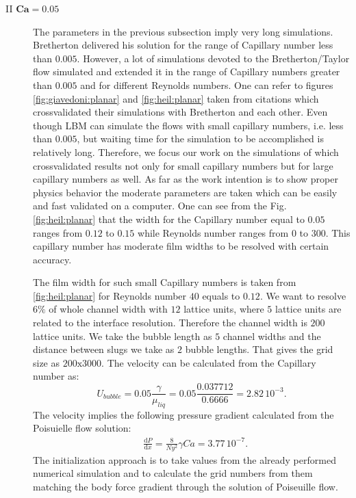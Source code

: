 \documentclass{article}
\begin{document}
\begin{description}
 \item[II $\bm{Ca=0.05}$] 
   The parameters in the previous subsection imply very long
simulations. Bretherton delivered his solution for the range of Capillary number
less than
  $0.005$. However, a lot of simulations devoted to the Bretherton/Taylor
flow
  simulated and extended it in the range of Capillary numbers greater than
$0.005$
  and for different Reynolds numbers. One can refer to figures
  \ref{fig:giavedoni:planar} and \ref{fig:heil:planar} taken from citations
  \cite{giavedoni-numerical,heil-bretherton} which crossvalidated their
  simulations with Bretherton and each other. Even though LBM can simulate the
flows with small capillary numbers, i.e. less than $0.005$, but waiting time
for the simulation to be accomplished is relatively long. Therefore, we focus
our work on the simulations of \citet{giavedoni-numerical} which crossvalidated
results not only for small capillary numbers but for large capillary numbers as
well. As far as the work intention is
  to show proper physics behavior the moderate parameters are
taken which
  can be easily and fast validated on a computer. 
  One can see from the Fig. \ref{fig:heil:planar} that the width for the
  Capillary number equal to $0.05$ ranges from $0.12$ to $0.15$ while Reynolds
  number ranges from $0$ to $300$. This capillary number has moderate film
widths
  to be resolved with certain accuracy. 

  The film width for such small Capillary numbers is taken from
  \ref{fig:heil:planar} for Reynolds number $40$ equals to $0.12$. We want to
  resolve $6\%$ of whole channel width with $12$ lattice units, where $5$
lattice units are related to the interface resolution.  Therefore the channel
  width is $200$ lattice units. We take the bubble length as $5$ channel widths
  and the distance between slugs we take as $2$ bubble lengths. That gives
the grid size as $200\mathrm{x}3000$. The velocity can be
calculated from the Capillary number as:
  \begin{equation}
  U_{bubble}=0.05 \frac{\gamma}{\mu_{liq}}=0.05 \frac{0.037712}{0.6666}=2.82\,
  10^{-3}.
  \end{equation}
  The velocity implies the following pressure gradient calculated from the
  Poisuielle flow solution:
  \begin{equation}
  \begin{aligned}
  &\frac{\mathrm{d}P}{\mathrm{d}x}=\frac{8}{Ny^2}\gamma Ca=3.77\,10^{-7}.
  \end{aligned}
  \end{equation}
  The initialization approach is to take values from the already performed
numerical simulation and to calculate the grid numbers from them matching the
body force gradient through the solution of Poiseuille flow.   

\end{description}
\end{document}

